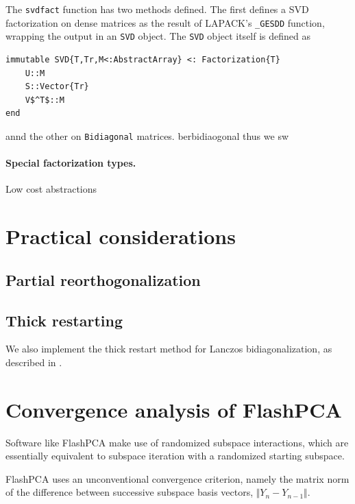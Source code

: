 \documentclass[final,leqno]{siamltex1213}
\begin{document}
The \verb|svdfact| function has two methods defined. The first defines a SVD
factorization on dense matrices as the result of LAPACK's \verb|_GESDD|
function, wrapping the output in an \verb|SVD| object. The \verb|SVD| object itself is defined as

\begin{lstlisting}
immutable SVD{T,Tr,M<:AbstractArray} <: Factorization{T}
    U::M
    S::Vector{Tr}
    V$^T$::M
end
\end{lstlisting}


annd the other on \verb|Bidiagonal| matrices. berbidiaogonal thus we
sw

\paragraph{Special factorization types.}
Low cost abstractions

\section{Practical considerations}

\subsection{Partial reorthogonalization}



\subsection{Thick restarting}

We also implement the thick restart method for Lanczos bidiagonalization, as described in \cite{Baglama2005}.


\section{Convergence analysis of FlashPCA}

Software like FlashPCA make use of randomized subspace interactions, which are
essentially equivalent to subspace iteration with a randomized starting subspace.

FlashPCA uses an unconventional convergence criterion, namely the matrix norm
of the difference between successive subspace basis vectors,
$\Vert Y_n - Y_{n-1} \Vert$.
\end{document}
